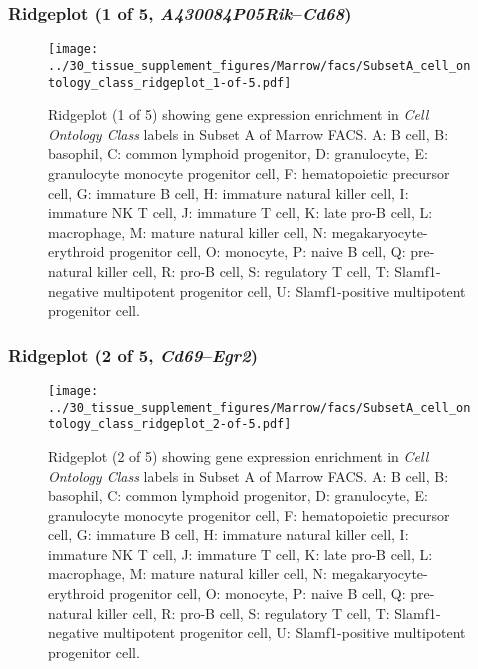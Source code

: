 \subsubsection{Ridgeplot (1 of 5, \emph{A430084P05Rik}--\emph{Cd68})}
\begin{figure}[h]
\centering
\texttt{[image: ../30\_tissue\_supplement\_figures/Marrow/facs/SubsetA\_cell\_ontology\_class\_ridgeplot\_1-of-5.pdf]}

\caption{ Ridgeplot (1 of 5)  showing gene expression enrichment in \emph{Cell Ontology Class} labels in Subset A of Marrow FACS. A: B cell, B: basophil, C: common lymphoid progenitor, D: granulocyte, E: granulocyte monocyte progenitor cell, F: hematopoietic precursor cell, G: immature B cell, H: immature natural killer cell, I: immature NK T cell, J: immature T cell, K: late pro-B cell, L: macrophage, M: mature natural killer cell, N: megakaryocyte-erythroid progenitor cell, O: monocyte, P: naive B cell, Q: pre-natural killer cell, R: pro-B cell, S: regulatory T cell, T: Slamf1-negative multipotent progenitor cell, U: Slamf1-positive multipotent progenitor cell.}
\end{figure}


\clearpage

\subsubsection{Ridgeplot (2 of 5, \emph{Cd69}--\emph{Egr2})}
\begin{figure}[h]
\centering
\texttt{[image: ../30\_tissue\_supplement\_figures/Marrow/facs/SubsetA\_cell\_ontology\_class\_ridgeplot\_2-of-5.pdf]}

\caption{ Ridgeplot (2 of 5)  showing gene expression enrichment in \emph{Cell Ontology Class} labels in Subset A of Marrow FACS. A: B cell, B: basophil, C: common lymphoid progenitor, D: granulocyte, E: granulocyte monocyte progenitor cell, F: hematopoietic precursor cell, G: immature B cell, H: immature natural killer cell, I: immature NK T cell, J: immature T cell, K: late pro-B cell, L: macrophage, M: mature natural killer cell, N: megakaryocyte-erythroid progenitor cell, O: monocyte, P: naive B cell, Q: pre-natural killer cell, R: pro-B cell, S: regulatory T cell, T: Slamf1-negative multipotent progenitor cell, U: Slamf1-positive multipotent progenitor cell.}
\end{figure}


\clearpage

